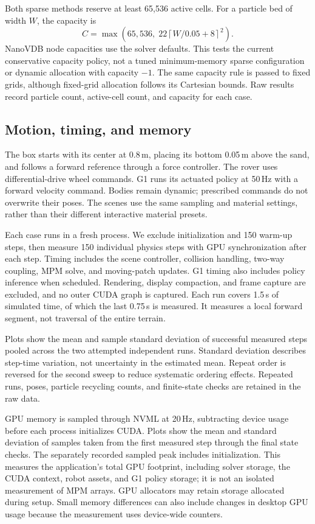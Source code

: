 \documentclass[10pt,a4paper]{article}
\begin{document}
Both sparse methods reserve at least 65,536 active cells. For a particle bed of width $W$, the capacity is
\[
 C=\max\left(65{,}536,\;22\left\lceil W/0.05+8\right\rceil^2\right).
\]
NanoVDB node capacities use the solver defaults. This tests the current conservative capacity policy, not a tuned minimum-memory sparse configuration or dynamic allocation with capacity $-1$. The same capacity rule is passed to fixed grids, although fixed-grid allocation follows its Cartesian bounds. Raw results record particle count, active-cell count, and capacity for each case.

\subsection{Motion, timing, and memory}
The box starts with its center at 0.8\,m, placing its bottom 0.05\,m above the sand, and follows a forward reference through a force controller. The rover uses differential-drive wheel commands. G1 runs its actuated policy at 50\,Hz with a forward velocity command. Bodies remain dynamic; prescribed commands do not overwrite their poses. The scenes use the same sampling and material settings, rather than their different interactive material presets.

Each case runs in a fresh process. We exclude initialization and 150 warm-up steps, then measure 150 individual physics steps with GPU synchronization after each step. Timing includes the scene controller, collision handling, two-way coupling, MPM solve, and moving-patch updates. G1 timing also includes policy inference when scheduled. Rendering, display compaction, and frame capture are excluded, and no outer CUDA graph is captured. Each run covers 1.5\,s of simulated time, of which the last 0.75\,s is measured. It measures a local forward segment, not traversal of the entire terrain.

Plots show the mean and sample standard deviation of successful measured steps pooled across the two attempted independent runs. Standard deviation describes step-time variation, not uncertainty in the estimated mean. Repeat order is reversed for the second sweep to reduce systematic ordering effects. Repeated runs, poses, particle recycling counts, and finite-state checks are retained in the raw data.

GPU memory is sampled through NVML at 20\,Hz, subtracting device usage before each process initializes CUDA. Plots show the mean and standard deviation of samples taken from the first measured step through the final state checks. The separately recorded sampled peak includes initialization. This measures the application's total GPU footprint, including solver storage, the CUDA context, robot assets, and G1 policy storage; it is not an isolated measurement of MPM arrays. GPU allocators may retain storage allocated during setup. Small memory differences can also include changes in desktop GPU usage because the measurement uses device-wide counters.
\end{document}
